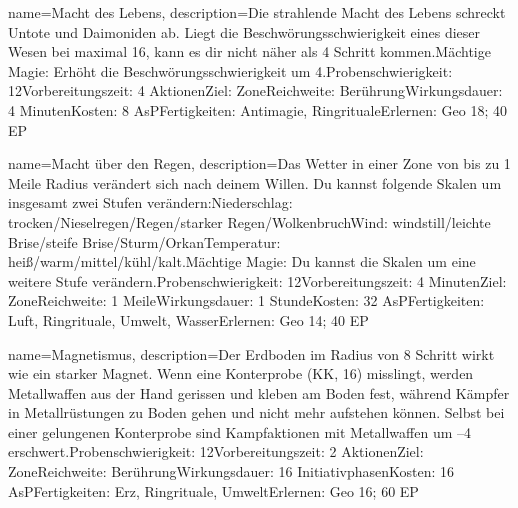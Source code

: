 {
    name={Macht des Lebens},
    description={Die strahlende Macht des Lebens schreckt Untote und Daimoniden ab. Liegt die Beschwörungsschwierigkeit eines dieser Wesen bei maximal 16, kann es dir nicht näher als 4 Schritt kommen.\newline Mächtige Magie: Erhöht die Beschwörungsschwierigkeit um 4.\newline Probenschwierigkeit: 12\newline Vorbereitungszeit: 4 Aktionen\newline Ziel: Zone\newline Reichweite: Berührung\newline Wirkungsdauer: 4 Minuten\newline Kosten: 8 AsP\newline Fertigkeiten: Antimagie, Ringrituale\newline Erlernen: Geo 18; 40 EP}
}


{
    name={Macht über den Regen},
    description={Das Wetter in einer Zone von bis zu 1 Meile Radius verändert sich nach deinem Willen. Du kannst folgende Skalen um insgesamt zwei Stufen verändern:\newline Niederschlag: trocken/Nieselregen/Regen/starker Regen/Wolkenbruch\newline Wind: windstill/leichte Brise/steife Brise/Sturm/Orkan\newline Temperatur: heiß/warm/mittel/kühl/kalt.\newline Mächtige Magie: Du kannst die Skalen um eine weitere Stufe verändern.\newline Probenschwierigkeit: 12\newline Vorbereitungszeit: 4 Minuten\newline Ziel: Zone\newline Reichweite: 1 Meile\newline Wirkungsdauer: 1 Stunde\newline Kosten: 32 AsP\newline Fertigkeiten: Luft, Ringrituale, Umwelt, Wasser\newline Erlernen: Geo 14; 40 EP}
}


{
    name={Magnetismus},
    description={Der Erdboden im Radius von 8 Schritt wirkt wie ein starker Magnet. Wenn eine Konterprobe (KK, 16) misslingt, werden Metallwaffen aus der Hand gerissen und kleben am Boden fest, während Kämpfer in Metallrüstungen zu Boden gehen und nicht mehr aufstehen können. Selbst bei einer gelungenen Konterprobe sind Kampfaktionen mit Metallwaffen um –4 erschwert.\newline Probenschwierigkeit: 12\newline Vorbereitungszeit: 2 Aktionen\newline Ziel: Zone\newline Reichweite: Berührung\newline Wirkungsdauer: 16 Initiativphasen\newline Kosten: 16 AsP\newline Fertigkeiten: Erz, Ringrituale, Umwelt\newline Erlernen: Geo 16; 60 EP}
}


